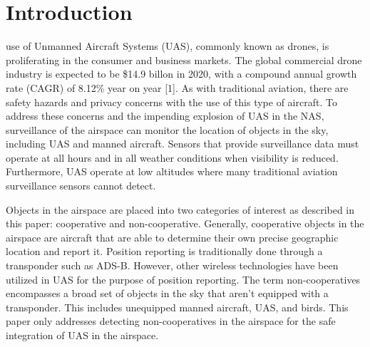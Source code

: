 \documentclass[journal,transmag]{IEEEtran}
\begin{document}
%
\IEEEpeerreviewmaketitle



\section{Introduction}
% 
% 
% 
% 
 use of Unmanned Aircraft Systems (UAS), commonly known as drones, is proliferating in the consumer and business markets. The global commercial drone industry is expected to be \$14.9 billon in 2020, with a compound annual growth rate (CAGR) of 8.12\%  year on year [1]. As with traditional aviation, there are safety hazards and privacy concerns with the use of this type of aircraft. To address these concerns and the impending explosion of UAS in the NAS, surveillance of the airspace can monitor the location of objects in the sky, including UAS and manned aircraft. Sensors that provide surveillance data must operate at all hours and in all weather conditions when visibility is reduced. Furthermore, UAS operate at low altitudes where many traditional aviation surveillance sensors cannot detect.

Objects in the airspace are placed into two categories of interest as described in this paper: cooperative and non-cooperative.  Generally, cooperative objects in the airspace are aircraft that are able to determine their own precise geographic location and report it.  Position reporting is traditionally done through a transponder such as ADS-B. However, other wireless technologies have been utilized in UAS for the purpose of position reporting. The term non-cooperatives encompasses a broad set of objects in the sky that aren’t equipped with a transponder.  This includes unequipped manned aircraft, UAS, and birds. This paper only addresses detecting non-cooperatives in the airspace for the safe integration of UAS in the airspace.
\end{document}

